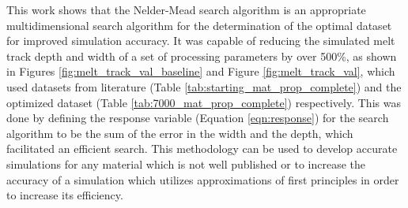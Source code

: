 \label{conclusions}

This work shows that the Nelder-Mead search algorithm is an appropriate multidimensional search algorithm for the determination of the optimal dataset for improved simulation accuracy.  It was capable of reducing the simulated melt track depth and width of a set of processing parameters by over 500\%, as shown in Figures \ref{fig:melt_track_val_baseline} and Figure \ref{fig:melt_track_val}, which used datasets from literature (Table \ref{tab:starting_mat_prop_complete}) and the optimized dataset (Table \ref{tab:7000_mat_prop_complete}) respectively.  This was done by defining the response variable (Equation \ref{eqn:response}) for the search algorithm to be the sum of the error in the width and the depth, which facilitated an efficient search.  
This methodology can be used to develop accurate simulations for any material which is not well published or to increase the accuracy of a simulation which utilizes approximations of first principles in order to increase its efficiency.
